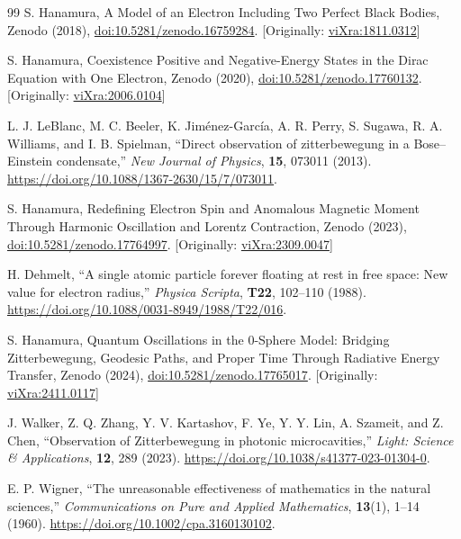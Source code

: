 \documentclass[%
 reprint,
 amsmath,amssymb,
 aps,
]{revtex4-1}
\numberwithin{equation}{section}%
\begin{document}
\begin{thebibliography}{99}
S. Hanamura, A Model of an Electron Including Two Perfect Black Bodies, Zenodo (2018), \href{https://doi.org/10.5281/zenodo.16759284}{doi:10.5281/zenodo.16759284}. [Originally: \href{https://vixra.org/abs/1811.0312}{viXra:1811.0312}]

S. Hanamura, Coexistence Positive and Negative-Energy States in the Dirac Equation with One Electron, Zenodo (2020), \href{https://doi.org/10.5281/zenodo.17760132}{doi:10.5281/zenodo.17760132}. [Originally: \href{https://vixra.org/abs/2006.0104}{viXra:2006.0104}]

L. J. LeBlanc, M. C. Beeler, K. Jiménez-García, A. R. Perry, S. Sugawa, R. A. Williams, and I. B. Spielman, ``Direct observation of zitterbewegung in a Bose–Einstein condensate,'' \textit{New Journal of Physics}, \textbf{15}, 073011 (2013). \href{https://doi.org/10.1088/1367-2630/15/7/073011}{https://doi.org/10.1088/1367-2630/15/7/073011}.

S. Hanamura, Redefining Electron Spin and Anomalous Magnetic Moment Through Harmonic Oscillation and Lorentz Contraction, Zenodo (2023), \href{https://doi.org/10.5281/zenodo.17764997}{doi:10.5281/zenodo.17764997}. [Originally: \href{https://vixra.org/abs/2309.0047}{viXra:2309.0047}]

H. Dehmelt, ``A single atomic particle forever floating at rest in free space: New value for electron radius,'' \textit{Physica Scripta}, \textbf{T22}, 102--110 (1988). \href{https://doi.org/10.1088/0031-8949/1988/T22/016}{https://doi.org/10.1088/0031-8949/1988/T22/016}.

S. Hanamura, Quantum Oscillations in the 0-Sphere Model: Bridging Zitterbewegung, Geodesic Paths, and Proper Time Through Radiative Energy Transfer, Zenodo (2024), \href{https://doi.org/10.5281/zenodo.17765017}{doi:10.5281/zenodo.17765017}. [Originally: \href{https://vixra.org/abs/2411.0117}{viXra:2411.0117}]

J. Walker, Z. Q. Zhang, Y. V. Kartashov, F. Ye, Y. Y. Lin, A. Szameit, and Z. Chen, ``Observation of Zitterbewegung in photonic microcavities,'' \textit{Light: Science \& Applications}, \textbf{12}, 289 (2023). \href{https://doi.org/10.1038/s41377-023-01304-0}{https://doi.org/10.1038/s41377-023-01304-0}.

E. P. Wigner, ``The unreasonable effectiveness of mathematics in the natural sciences,'' \textit{Communications on Pure and Applied Mathematics}, \textbf{13}(1), 1--14 (1960). \href{https://doi.org/10.1002/cpa.3160130102}{https://doi.org/10.1002/cpa.3160130102}.


\end{thebibliography}
\end{document}
